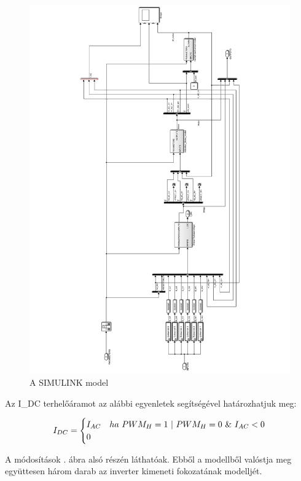 \begin{figure}[]
	\centering
	\includegraphics[width = \textwidth]{figures/hil_model.pdf}
	\caption{A SIMULINK model} 
	\label{fig:original_model}
\end{figure}

Az I_{DC} terhelőáramot az alábbi egyenletek segítségével határozhatjuk meg:

\begin{equation}
\centering
$$
I_{DC}
=
\begin{cases}
I_{AC}   & ha \  PWM_H = 1 \  | \  PWM_H = 0 \  \& \  I_{AC} < 0 \\
0 & 
\end{cases}
$$    
\end{equation}

A módosítások . ábra alsó részén láthatóak. Ebből a modellből valóstja meg együttesen három darab az inverter kimeneti fokozatának modelljét. 

